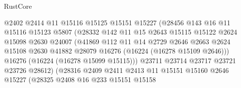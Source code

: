\begin{lexlean}{RustCore}
\begin{coremodule}
                                @2402
                                @2414
                                @11
                                @15116
                                @15125
                                @15151
                                @15227
                                (@28456
                                  @143
                                  @16
                                  @11
                                  @15116
                                  @15123
                                  @5807
                                  (@28332
                                    @142
                                    @11
                                    @15
                                    @2643
                                    @15115
                                    @15122
                                    @2624
                                    @15098
                                    @2630
                                    @24007
                                    (@41869
                                      @112
                                      @11
                                      @14
                                      @2729
                                      @2646
                                      @2663
                                      @2624
                                      @15108
                                      @2630
                                      @41882
                                      @28079
                                      @16276
                                      (@16224 (@16278 @15109 @2646)))
                                    @16276
                                    (@16224 (@16278 @15099 @15115)))
                                  @23711
                                  @23714
                                  @23717
                                  @23721
                                  @23726
                                  @28612)
                                (@28316
                                  @2409
                                  @2411
                                  @2413
                                  @11
                                  @15151
                                  @15160
                                  @2646
                                  @15227
                                  (@28325
                                    @2408
                                    @16
                                    @233
                                    @15151
                                    @15158

\end{coremodule}
\end{lexlean}
